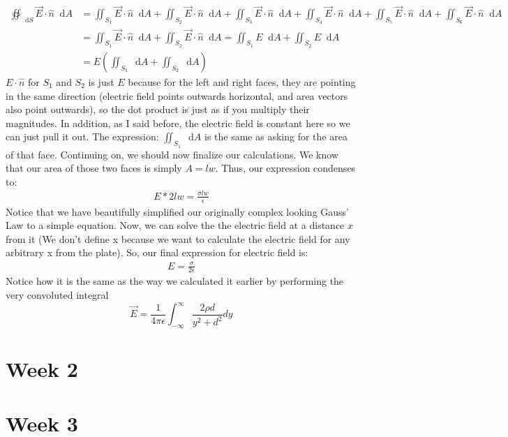 \documentclass{article}
\newcommand*\dif{\mathop{}\!\mathrm{d}}
\begin{document}
\begin{align*}
	\oiint_{\dif S} \vec{E} \cdot \hat{n} \dif A &= \iint_{S_1} \vec{E} \cdot \hat{n} \dif A + \iint_{S_2} \vec{E} \cdot \hat{n} \dif A + \iint_{S_3} \vec{E} \cdot \hat{n} \dif A + \iint_{S_4} \vec{E} \cdot \hat{n} \dif A + \iint_{S_5} \vec{E} \cdot \hat{n} \dif A + \iint_{S_6} \vec{E} \cdot \hat{n} \dif A \\
	&= \iint_{S_1} \vec{E} \cdot \hat{n} \dif A + \iint_{S_2} \vec{E} \cdot \hat{n} \dif A = \iint_{S_1} E \dif A + \iint_{S_2} E \dif A\\
	&= E(\iint_{S_1} \dif A + \iint_{S_2} \dif A)
\end{align*}
$E\cdot \hat{n}$ for $S_1$ and $S_2$ is just $E$ because for the left and right faces, they are pointing in the same direction (electric field points outwards horizontal, and area vectors also point outwards), so the dot product is just as if you multiply their magnitudes. In addition, as I said before, the electric field is constant here so we can just pull it out. The expression: $\iint_{S_1} \dif A$ is the same as asking for the area of that face. Continuing on, we should now finalize our calculations.
We know that our area of those two faces is simply $A = lw$. Thus, our expression condenses to:
\begin{align*}
	E*2lw = \frac{\sigma lw}{\epsilon}
\end{align*}
Notice that we have beautifully simplified our originally complex looking Gauss' Law to a simple equation. Now, we can solve the the electric field at a distance $x$ from it (We don't define x because we want to calculate the electric field for any arbitrary x from the plate). So, our final expression for electric field is:
\begin{align*}
	E =  \frac{\sigma}{2\epsilon}
\end{align*}
Notice how it is the same as the way we calculated it earlier by performing the very convoluted integral $$\vec{E} = \frac{1}{4\pi\epsilon}\int_{-\infty}^{\infty} \frac{2\rho d}{y^2 + d^2} dy$$
\pagebreak

\section{Week 2}

\pagebreak

\section{Week 3}
\end{document}
